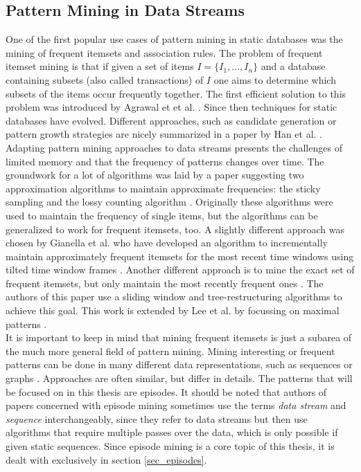 \subsection{Pattern Mining in Data Streams}
\label{subsec_PatternMining}
One of the first popular use cases of pattern mining in static databases was the mining of frequent itemsets and association rules. The problem of frequent itemset mining is that if given a set of items $I = \{I_1,...,I_n\}$ and a database containing subsets (also called transactions) of $I$ one aims to determine which subsets of the items occur frequently together. The first efficient solution to this problem was introduced by Agrawal et et al. \cite{agrawal1993mining}. Since then techniques for static databases have evolved. Different approaches, such as candidate generation or pattern growth strategies are nicely summarized in a paper by Han et al. \cite{han2007frequent}. Adapting pattern mining approaches to data streams presents the challenges of limited memory and that the frequency of patterns changes over time. The groundwork for a lot of algorithms was laid by a paper suggesting two approximation algorithms to maintain approximate frequencies: the sticky sampling and the lossy counting algorithm \cite{manku2002approximate}. Originally these algorithms were used to maintain the frequency of single items, but the algorithms can be generalized to work for frequent itemsets, too. A slightly different approach was chosen by Gianella et al. who have developed an algorithm to incrementally maintain approximately frequent itemsets for the most recent time windows using tilted time window frames \cite{giannella2003mining}. Another different approach is to mine the exact set of frequent itemsets, but only maintain the most recently frequent ones \citep{tanbeer2009sliding}. The authors of this paper use a sliding window and tree-restructuring algorithms to achieve this goal. This work is extended by Lee et al. by focussing on maximal patterns \cite{lee2014sliding}. \\
It is important to keep in mind that mining frequent itemsets is just a subarea of the much more general field of pattern mining. Mining interesting or frequent patterns can be done in many different data representations, such as sequences \cite{mendes2008stream} or graphs \cite{bifet2011mining}. Approaches are often similar, but differ in details. The patterns that will be focused on in this thesis are episodes. It should be noted that authors of papers concerned with episode mining sometimes use the terms \textit{data stream} and \textit{sequence} interchangeably, since they refer to data streams but then use algorithms that require multiple passes over the data, which is only possible if given static sequences. Since episode mining is a core topic of this thesis, it is dealt with exclusively in section \ref{sec_episodes}.

